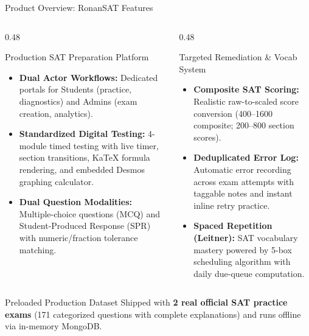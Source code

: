 ﻿\documentclass[aspectratio=169,10pt,t]{beamer}
\begin{document}
\begin{frame}{Product Overview: RonanSAT Features}
  \vspace{0.5mm}
  \begin{columns}[T]
    \begin{column}{0.48\textwidth}
      \begin{infoCard}{Production SAT Preparation Platform}
        \begin{itemize}\setlength{\itemsep}{1.2pt}\setlength{\parskip}{0pt}\setlength{\leftmargini}{8pt}
          \item \textbf{Dual Actor Workflows:} Dedicated portals for Students (practice, diagnostics) and Admins (exam creation, analytics).
          \item \textbf{Standardized Digital Testing:} 4-module timed testing with live timer, section transitions, KaTeX formula rendering, and embedded Desmos graphing calculator.
          \item \textbf{Dual Question Modalities:} Multiple-choice questions (MCQ) and Student-Produced Response (SPR) with numeric/fraction tolerance matching.
        \end{itemize}
      \end{infoCard}
    \end{column}

    \begin{column}{0.48\textwidth}
      \begin{infoCard}{Targeted Remediation \& Vocab System}
        \begin{itemize}\setlength{\itemsep}{1.2pt}\setlength{\parskip}{0pt}\setlength{\leftmargini}{8pt}
          \item \textbf{Composite SAT Scoring:} Realistic raw-to-scaled score conversion (400--1600 composite; 200--800 section scores).
          \item \textbf{Deduplicated Error Log:} Automatic error recording across exam attempts with taggable notes and instant inline retry practice.
          \item \textbf{Spaced Repetition (Leitner):} SAT vocabulary mastery powered by 5-box scheduling algorithm with daily due-queue computation.
        \end{itemize}
      \end{infoCard}
    \end{column}
  \end{columns}

  \vspace{1.2mm}
  \begin{hlCard}{Preloaded Production Dataset}
    Shipped with \textbf{2 real official SAT practice exams} (171 categorized questions with complete explanations) and runs offline via in-memory MongoDB.
  \end{hlCard}
\end{frame}
\end{document}

